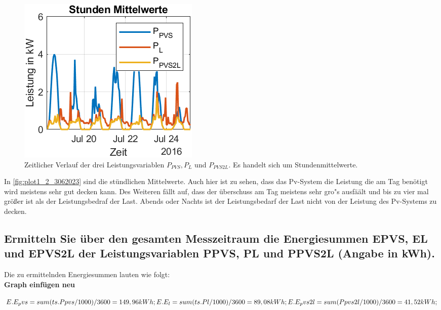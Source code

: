 \begin{figure}[H]
    \centering
    \includegraphics[width=\textwidth]{Abbildungen/aufgabe1_plot2.png}
    \caption{Zeitlicher Verlauf der drei Leistungsvariablen $P_{PVS}, P_{L}$ und $P_{PVS2L}$. Es handelt sich um Stundenmittelwerte.}
    \label{fig:plot1_2_3062023}
\end{figure}
In \autoref{fig:plot1_2_3062023} sind die stündlichen Mittelwerte. Auch hier ist zu sehen, dass das Pv-System die Leistung die am Tag benötigt wird meistens sehr gut decken kann. Des Weiteren fällt auf, dass der überschuss am Tag meistens sehr gro"s ausfäält und bis zu vier mal größer ist als der Leistungsbedraf der Last. Abends oder Nachts ist der Leistungsbedarf der Last nicht von der Leistung des Pv-Systems zu decken.
\subsection{Ermitteln Sie über den gesamten Messzeitraum die Energiesummen EPVS, EL und EPVS2L der
Leistungsvariablen PPVS, PL und PPVS2L (Angabe in kWh).}
Die zu ermittelnden Energiesummen lauten wie folgt:
\\
\textbf{Graph einfügen neu}

$E.E_pvs = sum(ts.Ppvs/1000)/3600=149,96kWh;\\
E.E_l = sum(ts.Pl/1000)/3600=89,08kWh;\\
E.E_pvs2l = sum(Ppvs2l/1000)/3600=41,52kWh;$\\

